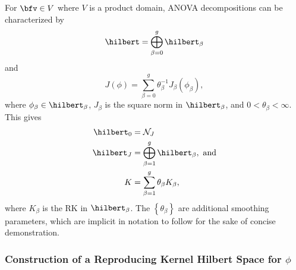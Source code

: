 For $\bfv \in V$ where $V$ is a product domain, ANOVA decompositions can be characterized by 
\begin{equation}\label{eq:ssanova-decomposition-of-RKHS}
\hilbert = \bigoplus\limits_{\beta=0}^{g} \hilbert_\beta
\end{equation}
\noindent
and
\begin{equation}\label{eq:ssanova-decomposition-of-penalty}
J\left(\phi\right) = \sum_{\beta=0}^{g} \theta^{-1}_\beta J_\beta \left( \phi_\beta \right),
\end{equation}
\noindent
where $\phi_\beta \in \hilbert_\beta$, $J_\beta$ is the square norm in $\hilbert_\beta$, and $0 < \theta_\beta < \infty$. This gives 
\begin{align*}
\hilbert_0 &= \mathcal{N}_J \\
\hilbert_J &= \bigoplus\limits_{\beta=1}^{g} \hilbert_\beta, \mbox{ and} \\
K &= \sum_{\beta=1}^g \theta_\beta K_\beta,
\end{align*}
\noindent
where $K_\beta$ is the RK in $\hilbert_\beta$. The $\left \{ \theta_\beta \right\}$ are additional smoothing parameters, which are implicit in notation to follow for the sake of concise demonstration. 


\subsubsection{Construction of a Reproducing Kernel Hilbert Space for $\phi$}

